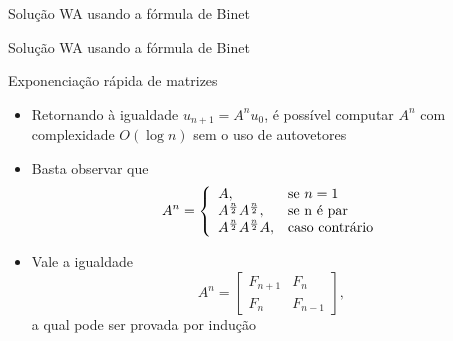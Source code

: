 \begin{frame}[fragile]{Solução WA usando a fórmula de Binet}
\end{frame}

\begin{frame}[fragile]{Solução WA usando a fórmula de Binet}
\end{frame}

\begin{frame}[fragile]{Exponenciação rápida de matrizes}

    \begin{itemize}
        \item Retornando à igualdade $u_{n + 1} = A^nu_0$, é possível computar $A^n$ com 
            complexidade $O(\log n)$ sem o uso de autovetores

        \item Basta observar que
        \[
            A^n = \left\lbrace \begin{array}{ll} A, & \mbox{se}\ n = 1 \\
                A^{\frac{n}{2}}A^{\frac{n}{2}}, & \mbox{se}\ $n$\ \mbox{é par} \\ 
                A^{\frac{n}{2}}A^{\frac{n}{2}}A, & \mbox{caso contrário}
                \end{array}
                \right.
        \]

        \item Vale a igualdade
        \[
            A^n = \begin{bmatrix} F_{n + 1} & F_n \\ F_n & F_{n - 1}\end{bmatrix},
        \]
        a qual pode ser provada por indução

    \end{itemize}
\end{frame}

